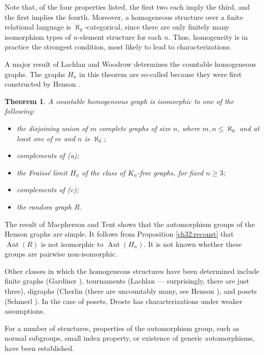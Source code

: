 \documentclass[12pt]{article}
\newtheorem{theorem}{Theorem}
\DeclareMathOperator{\Aut}{Aut}
\begin{document}
Note that, of the four properties listed, the first two each imply
the third, and the first implies the fourth. Moreover, a homogeneous
structure over a finite relational language is
$\aleph_0$-categorical, since there are only finitely many
isomorphism types of $n$-element structure for each $n$. Thus,
homogeneity is in practice the strongest condition, most likely to
lead to characterizations.

A major result of Lachlan and Woodrow \cite{ch32:bib35} determines
the countable homogeneous graphs. The graphs $H_n$ in this theorem are
so-called because they were first constructed by Henson \cite{ch32:bib26}.

\begin{theorem}\label{ch32:them10.1} 
A countable homogeneous graph is isomorphic to one of the following:
\begin{itemize}
\item[(a)] the disjoining union of $m$ complete graphs of size $n$, where $m, n \leq \aleph_0$ and at
least one of $m$ and $n$ is $\aleph_0$;
\item[(b)] complements of (a);
\item[(c)] the Fra\"{i}ss\'{e} limit $H_n$ of the class of $K_n$-free graphs, for fixed $n \geq 3$;
\item[(d)] complements of (c);
\item[(e)] the random graph $R$.
\end{itemize}
\end{theorem}

The result of Macpherson and Tent \cite{ch32:new11} shows that the
automorphism groups of the Henson graphs are simple.
It follows from Proposition \ref{ch32:reconst} that $\Aut(R)$ is not
isomorphic to $\Aut(H_n)$. It is
not known whether these groups are pairwise non-isomorphic.

Other classes in which the homogeneous structures have been
determined include finite graphs (Gardiner \cite{ch32:bib23}),
tournaments (Lachlan \cite{ch32:bib34} --- surprisingly, there are
just three), digraphs (Cherlin \cite{ch32:bib12} (there are 
uncountably many, see Henson \cite{ch32:bib27}), and posets (Schmerl
\cite{ch32:bib45}). In the case of posets, Droste \cite{ch32:bib14} has
characterizations under weaker assumptions.

For a number of structures, properties of the automorphism group,
such as normal subgroups, small index property, or existence of
generic automorphisms, have been established.
\end{document}
